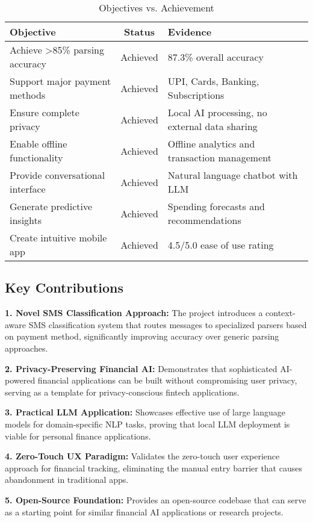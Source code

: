 \documentclass[11pt,a4paper]{report}
\begin{document}
\begin{table}[H]
\centering
\caption{Objectives vs. Achievement}
\begin{tabularx}{\textwidth}{|X|c|X|}
\hline
\textbf{Objective} & \textbf{Status} & \textbf{Evidence} \\
\hline
Achieve >85\% parsing accuracy & Achieved & 87.3\% overall accuracy \\
Support major payment methods & Achieved & UPI, Cards, Banking, Subscriptions \\
Ensure complete privacy & Achieved & Local AI processing, no external data sharing \\
Enable offline functionality & Achieved & Offline analytics and transaction management \\
Provide conversational interface & Achieved & Natural language chatbot with LLM \\
Generate predictive insights & Achieved & Spending forecasts and recommendations \\
Create intuitive mobile app & Achieved & 4.5/5.0 ease of use rating \\
\hline
\end{tabularx}
\end{table}

\subsection{Key Contributions}

\textbf{1. Novel SMS Classification Approach:}
The project introduces a context-aware SMS classification system that routes messages to specialized parsers based on payment method, significantly improving accuracy over generic parsing approaches.

\textbf{2. Privacy-Preserving Financial AI:}
Demonstrates that sophisticated AI-powered financial applications can be built without compromising user privacy, serving as a template for privacy-conscious fintech applications.

\textbf{3. Practical LLM Application:}
Showcases effective use of large language models for domain-specific NLP tasks, proving that local LLM deployment is viable for personal finance applications.

\textbf{4. Zero-Touch UX Paradigm:}
Validates the zero-touch user experience approach for financial tracking, eliminating the manual entry barrier that causes abandonment in traditional apps.

\textbf{5. Open-Source Foundation:}
Provides an open-source codebase that can serve as a starting point for similar financial AI applications or research projects.
\end{document}
